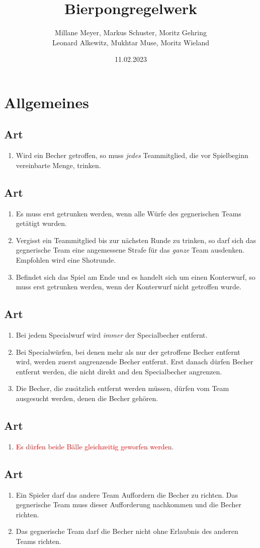 \documentclass[a4paper,11pt]{scrartcl}
\title{\Huge{Bierpongregelwerk}}
\author{Millane Meyer, Markus Schuster, Moritz Gehring \\Leonard Alkewitz, Mukhtar Muse, Moritz Wieland}
\date{\small{11.02.2023}}
\newcommand{\enum}[1]{\begin{enumerate}[label=(\arabic*)]#1\end{enumerate}}
\newcommand{\art}[2]{\subsection*{#1} \enum{#2}}
\newcommand{\new}[1]{\textcolor{red}{#1}}
\newcounter{art}
\begin{document}
\maketitle
\vspace*{-1cm}
\newpage

\section{Allgemeines}

\art{Art \theart}{
    \item
        Wird ein Becher getroffen, so muss \emph{jedes} Teammitglied, die vor Spielbeginn vereinbarte Menge, trinken.
}

\art{Art \theart}{
    \item
        Es muss erst getrunken werden, wenn alle Würfe des gegnerischen Teams getätigt wurden.
    \item
        Vergisst ein Teammitglied bis zur nächsten Runde zu trinken, so darf sich das gegnerische Team eine angemessene Strafe für das \emph{ganze} Team ausdenken. Empfohlen wird eine Shotrunde.
    \item
        Befindet sich das Spiel am Ende und es handelt sich um einen Konterwurf, so muss erst getrunken werden, wenn der Konterwurf nicht getroffen wurde.
}

\art{Art \theart}{
    \item
        Bei jedem Specialwurf wird \emph{immer} der Specialbecher entfernt.
    \item
        Bei Specialwürfen, bei denen mehr als nur der getroffene Becher entfernt wird, werden zuerst angrenzende Becher entfernt. Erst danach dürfen Becher entfernt werden, die nicht direkt and den Specialbecher angrenzen.
    \item
        Die Becher, die zusätzlich entfernt werden müssen, dürfen vom Team ausgesucht werden, denen die Becher gehören.
}

\art{Art \theart}{
    \item
        \new{Es dürfen beide Bälle gleichzeitig geworfen werden.}
}

\art{Art \theart}{
    \item
        Ein Spieler darf das andere Team Auffordern die Becher zu richten. Das gegnerische Team muss dieser Aufforderung nachkommen und die Becher richten.
    \item
        Das gegnerische Team darf die Becher nicht ohne Erlaubnis des anderen Teams richten.
}
\end{document}
